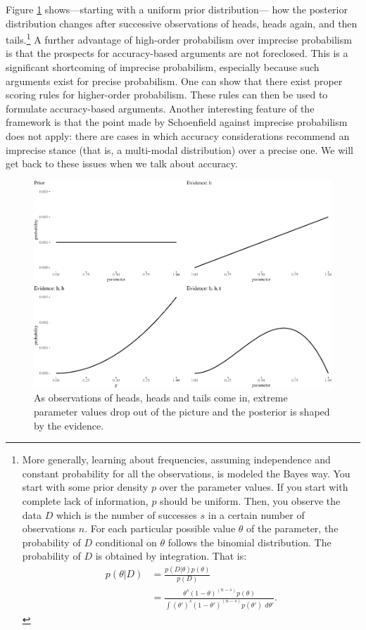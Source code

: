 \documentclass[
  10pt,
  dvipsnames,enabledeprecatedfontcommands]{scrartcl}
\begin{document}
Figure \ref{fig:intertia2} shows---starting with a uniform prior
distribution--- how the posterior distribution changes after successive
observations of heads, heads again, and then tails.\footnote{More
  generally, learning about frequencies, assuming independence and
  constant probability for all the observations, is modeled the Bayes
  way. You start with some prior density \(p\) over the parameter
  values. If you start with complete lack of information, \(p\) should
  be uniform. Then, you observe the data \(D\) which is the number of
  successes \(s\) in a certain number of observations \(n\). For each
  particular possible value \(\theta\) of the parameter, the probability
  of \(D\) conditional on \(\theta\) follows the binomial distribution.
  The probability of \(D\) is obtained by integration. That is:
  \begin{align*}
  p(\theta \vert D) & = \frac{p(D\vert \theta)p(\theta)}{p(D)}\\
  & = \frac{\theta^s (1-\theta)^{(n - s)}p(\theta)}{\int (\theta')^s (1-\theta')^{(n - s)}p(\theta')\,\, d\theta'}.
  \end{align*}} A further advantage of high-order probabilism over
imprecise probabilism is that the prospects for accuracy-based arguments
are not foreclosed. This is a significant shortcoming of imprecise
probabilism, especially because such arguments exist for precise
probabilism. One can show that there exist proper scoring rules for
higher-order probabilism. These rules can then be used to formulate
accuracy-based arguments. Another interesting feature of the framework
is that the point made by Schoenfield against imprecise probabilism does
not apply: there are cases in which accuracy considerations recommend an
imprecise stance (that is, a multi-modal distribution) over a precise
one. We will get back to these issues when we talk about accuracy.

\begin{figure}

\begin{center}\includegraphics[width=0.8\linewidth]{imprecision_philosophical_paper2_files/figure-latex/Figinertia3-1} \end{center}
\caption{As observations of heads, heads and tails come in, extreme parameter values drop out of the picture and the posterior is shaped by the evidence.}
\label{fig:intertia2}
\end{figure}
\end{document}
